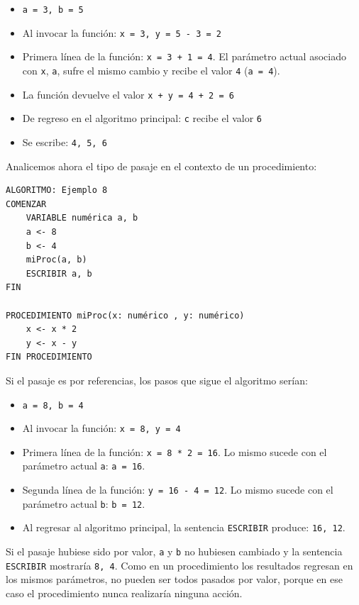 \documentclass[]{book}
\providecommand{\tightlist}{%
  \setlength{\itemsep}{0pt}\setlength{\parskip}{0pt}}
\begin{document}
\begin{itemize}
\tightlist
\item
  \texttt{a\ =\ 3,\ b\ =\ 5}
\item
  Al invocar la función: \texttt{x\ =\ 3,\ y\ =\ 5\ -\ 3\ =\ 2}
\item
  Primera línea de la función: \texttt{x\ =\ 3\ +\ 1\ =\ 4}. El
  parámetro actual asociado con \texttt{x}, \texttt{a}, sufre el mismo
  cambio y recibe el valor \texttt{4} (\texttt{a\ =\ 4}).
\item
  La función devuelve el valor \texttt{x\ +\ y\ =\ 4\ +\ 2\ =\ 6}
\item
  De regreso en el algoritmo principal: \texttt{c} recibe el valor
  \texttt{6}
\item
  Se escribe: \texttt{4,\ 5,\ 6}
\end{itemize}

Analicemos ahora el tipo de pasaje en el contexto de un procedimiento:

\begin{verbatim}
ALGORITMO: Ejemplo 8
COMENZAR
    VARIABLE numérica a, b
    a <- 8
    b <- 4
    miProc(a, b)
    ESCRIBIR a, b
FIN

PROCEDIMIENTO miProc(x: numérico , y: numérico)
    x <- x * 2
    y <- x - y
FIN PROCEDIMIENTO
\end{verbatim}

Si el pasaje es por referencias, los pasos que sigue el algoritmo
serían:

\begin{itemize}
\tightlist
\item
  \texttt{a\ =\ 8,\ b\ =\ 4}
\item
  Al invocar la función: \texttt{x\ =\ 8,\ y\ =\ 4}
\item
  Primera línea de la función: \texttt{x\ =\ 8\ *\ 2\ =\ 16}. Lo mismo
  sucede con el parámetro actual \texttt{a}: \texttt{a\ =\ 16}.
\item
  Segunda línea de la función: \texttt{y\ =\ 16\ -\ 4\ =\ 12}. Lo mismo
  sucede con el parámetro actual \texttt{b}: \texttt{b\ =\ 12}.
\item
  Al regresar al algoritmo principal, la sentencia \texttt{ESCRIBIR}
  produce: \texttt{16,\ 12}.
\end{itemize}

Si el pasaje hubiese sido por valor, \texttt{a} y \texttt{b} no hubiesen
cambiado y la sentencia \texttt{ESCRIBIR} mostraría \texttt{8,\ 4}. Como
en un procedimiento los resultados regresan en los mismos parámetros, no
pueden ser todos pasados por valor, porque en ese caso el procedimiento
nunca realizaría ninguna acción.
\end{document}
